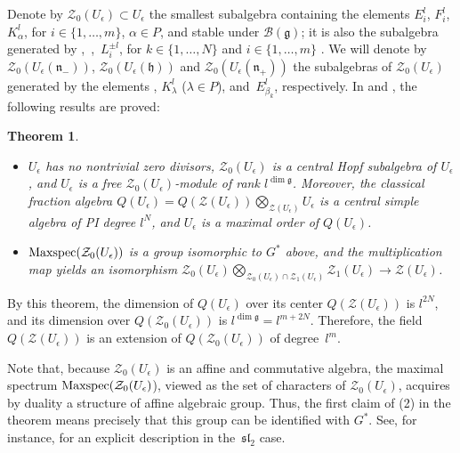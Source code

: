 \documentclass[10pt,a4paper]{amsart}
\numberwithin{equation}{section}
\newtheorem{teo}{Theorem}[section]
\theoremstyle{definition}
\newcommand{\e}{\epsilon}
\newcommand{\ra}{\rightarrow}
\begin{document}
Denote by $\mathcal{Z}_0(U_\e)\subset U_\e$ the smallest subalgebra containing the elements $E_i^l$, $F_i^l$, $K_\alpha^{l}$, for $i\in \{1,\dots,m\}$, $\alpha\in P$, and stable under $\mathcal{B}(\mathfrak{g})$; it is also the subalgebra generated by ,~,~$L_i^{\pm l}$, for $k\in \{1,\dots, N\}$ and $i\in \{1,\dots,m\}$ \cite[Section~18]{DC-K-P2}. We will denote by $\mathcal{Z}_0(U_\e(\mathfrak{n}_-))$, $\mathcal{Z}_0(U_\e(\mathfrak{h}))$ and $\mathcal{Z}_0(U_\e(\mathfrak{n}_+))$ the subalgebras of $\mathcal{Z}_0(U_\e)$ generated by the elements , $K_{\lambda}^l$ ($\lambda\in P$), and~$E_{\beta_k}^l$, respectively. In \cite[Sections~1.8, 3.3 and 3.8]{DC-K} and \cite[Theorem~14.1 and Sections~20--21]{DC-K-P2}, the following results are proved:

\begin{teo} \label{DCKteo1}\quad
\begin{itemize}\itemsep=0pt
\item[$(1)$] $U_\e$ has no nontrivial zero divisors, $\mathcal{Z}_0(U_\e)$ is a central Hopf subalgebra of $U_\e$, and $U_\e$ is a free $\mathcal{Z}_0(U_\e)$-module of rank $l^{\dim \mathfrak{g}}$. Moreover, the classical fraction algebra $Q(U_\e) = Q(\mathcal{Z}(U_\e))\bigotimes_{\mathcal{Z}(U_\e)} U_\e$ is a central simple algebra of PI degree $l^{N}$, and $U_\e$ is a maximal order of $Q(U_\e)$.
\item[$(2)$] ${\rm Maxspec}(\mathcal{Z}_0(U_\e))$ is a group isomorphic to $G^*$ above, and the multiplication map yields an isomorphism $\mathcal{Z}_0(U_\e)\bigotimes_{\mathcal{Z}_0(U_\e)\cap \mathcal{Z}_1(U_\e)} \mathcal{Z}_1(U_\e) \ra \mathcal{Z}(U_\e)$.
\end{itemize}
\end{teo}

By this theorem, the dimension of $Q(U_\e)$ over its center $Q(\mathcal{Z}(U_\e))$ is $l^{2N}$, and its dimension over $Q(\mathcal{Z}_0(U_\e))$ is $l^{\dim \mathfrak{g}} = l^{m+2N}$. Therefore, the field $Q(\mathcal{Z}(U_\e))$ is an extension of $Q(\mathcal{Z}_0(U_\e))$ of degree~$l^m$.

Note that, because $\mathcal{Z}_0(U_\e)$ is an affine and commutative algebra, the maximal spectrum ${\rm Maxspec}(\mathcal{Z}_0(U_\e)$), viewed as the set of characters of $\mathcal{Z}_0(U_\e)$, acquires by duality a structure of affine algebraic group. Thus, the first claim of (2) in the theorem means precisely that this group can be identified with $G^*$. See, for instance, \cite[Section~7.2.1]{BR} for an explicit description in the~${\mathfrak{sl}_2}$ case.
\end{document}

